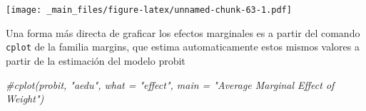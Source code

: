\documentclass[
]{book}
\newenvironment{Shaded}{\begin{snugshade}}{\end{snugshade}}
\newcommand{\CommentTok}[1]{\textcolor[rgb]{0.56,0.35,0.01}{\textit{#1}}}
\begin{document}
\texttt{[image: \_main\_files/figure-latex/unnamed-chunk-63-1.pdf]}

Una forma más directa de graficar los efectos marginales es a partir del comando \texttt{cplot} de la familia margins, que estima automaticamente estos mismos valores a partir de la estimación del modelo probit

\begin{Shaded}
\begin{Highlighting}[]
\CommentTok{\#cplot(probit, "aedu", what = "effect", main = "Average Marginal Effect of Weight")}
\end{Highlighting}
\end{Shaded}


  
\end{document}
